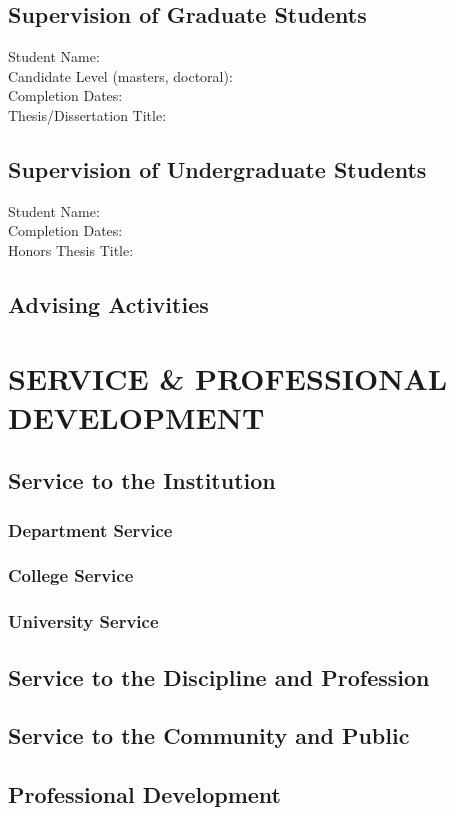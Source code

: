 \documentclass[a4paper,9pt]{extarticle}
\newenvironment{subs} %
  {\adjustwidth{2em}{0pt}}
  {\endadjustwidth}
\begin{document}
    \subsection*{Supervision of Graduate Students}
        Student Name:\\
        Candidate Level (masters, doctoral):\\
        Completion Dates:\\
        Thesis/Dissertation Title: 
    \subsection*{Supervision of Undergraduate Students}
        Student Name:\\
        Completion Dates:\\
        Honors Thesis Title: 
    \subsection*{Advising Activities}
        \lipsum[1][5-11]

\section*{SERVICE \& PROFESSIONAL DEVELOPMENT}
    \subsection*{Service to the Institution}
    \begin{subs}
        \subsubsection*{Department Service} 
            \lipsum[1][5-8]
        \subsubsection*{College Service}
            \lipsum[1][5-8]
        \subsubsection*{University Service}
            \lipsum[1][5-8]
    \end{subs}
    \subsection*{Service to the Discipline and Profession}
        \lipsum[1][3-9]
    \subsection*{Service to the Community and Public}
        \lipsum[1][3-9]
    \subsection*{Professional Development}
    \lipsum[1][3-9]

\end{document}
